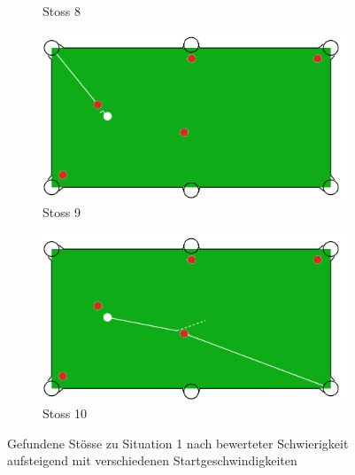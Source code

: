 \begin{figure}[h!]
\begin{subfigure}[b]{0.3\textwidth}
        \caption{Stoss 8}
        \label{fig:situation_velocity_1_solution_8}
    \end{subfigure}
    \hfill
    \begin{subfigure}[b]{0.3\textwidth}
        \centering
        \includegraphics[width=1.0\linewidth]{../common/04_results/resources/simple_search/situation_diverse_solution_velocity_9.PNG}
        \caption{Stoss 9}
        \label{fig:situation_velocity_1_solution_9}
    \end{subfigure}
    \hfill
    \begin{subfigure}[b]{0.3\textwidth}
        \centering
        \includegraphics[width=1.0\linewidth]{../common/04_results/resources/simple_search/situation_diverse_solution_velocity_10.PNG}
        \caption{Stoss 10}
        \label{fig:situation_velocity_1_solution_10}
    \end{subfigure}
    \caption{Gefundene Stösse zu Situation 1 nach bewerteter Schwierigkeit aufsteigend mit verschiedenen Startgeschwindigkeiten}
    \label{fig:situation_1_solutions_startgeschwindigkeit}
\end{figure}

